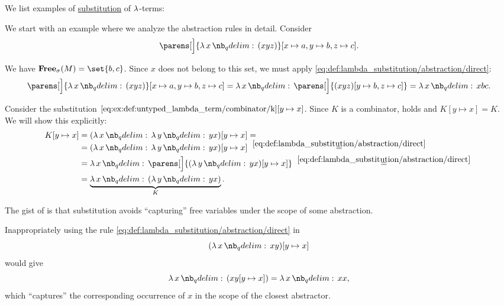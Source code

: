 \begin{example}\label{ex:def:lambda_substitution}
  We list examples of \hyperref[def:lambda_substitution]{substitution} of \( \mathrm{\lambda} \)-terms:
  \begin{thmenum}
     We start with an example where we analyze the abstraction rules in detail. Consider
    \begin{equation*}
      \parens[\Big]{ \qabs x (xyz) }[x \mapsto a, y \mapsto b, z \mapsto c].
    \end{equation*}

    We have \( \op*{Free}_\sigma(M) = \set{ b, c } \). Since \( x \) does not belong to this set, we must apply \eqref{eq:def:lambda_substitution/abstraction/direct}:
    \begin{equation*}
      \parens[\Big]{ \qabs x (xyz) }[x \mapsto a, y \mapsto b, z \mapsto c]
      =
      \qabs x \parens[\Big]{ (xyz)[y \mapsto b, z \mapsto c] }
      =
      \qabs x x b c.
    \end{equation*}

     Consider the substitution \( \ref{eq:ex:def:untyped_lambda_term/combinator/k}[y \mapsto x] \). Since  \( K \) is a combinator,  holds and \( K[y \mapsto x] = K \). We will show this explicitly:
    \begin{align*}
      K[y \mapsto x]
      &=
      (\qabs x \qabs y yx)[y \mapsto x]
      = \\ &=
      (\qabs x \qabs y yx)[y \mapsto x]
      \reloset {\eqref{eq:def:lambda_substitution/abstraction/direct}} = \\ &=
      \qabs x \parens[\Big]{ (\qabs y yx)[y \mapsto x] }
      \reloset {\eqref{eq:def:lambda_substitution/abstraction/direct}} = \\ &=
      \underbrace{\qabs x (\qabs y y x)}_{K}.
    \end{align*}

     The gist of  is that substitution avoids \enquote{capturing} free variables under the scope of some abstraction.

    Inappropriately using the rule \eqref{eq:def:lambda_substitution/abstraction/direct} in
    \begin{equation*}
      (\qabs x xy)[y \mapsto x]
    \end{equation*}
    would give
    \begin{equation*}
      \qabs x (xy[y \mapsto x]) = \qabs x x x,
    \end{equation*}
    which \enquote{captures} the corresponding occurrence of \( x \) in the scope of the closest abstractor.


\end{thmenum}
\end{example}
